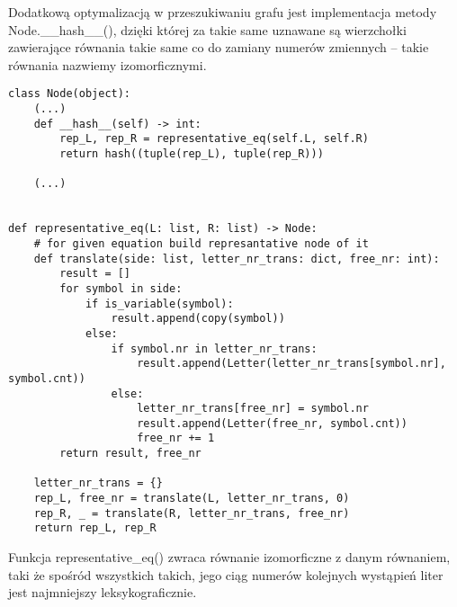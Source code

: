 \documentclass[leqno, 12pt]{article}
\begin{document}
Dodatkową optymalizacją w przeszukiwaniu grafu jest implementacja metody Node.\_\_hash\_\_(), dzięki której za takie same uznawane są wierzchołki zawierające równania takie same co do zamiany numerów zmiennych -- takie równania nazwiemy izomorficznymi.

\begin{verbatim}
class Node(object):
    (...)
    def __hash__(self) -> int:
        rep_L, rep_R = representative_eq(self.L, self.R)
        return hash((tuple(rep_L), tuple(rep_R)))

    (...)


def representative_eq(L: list, R: list) -> Node:
    # for given equation build represantative node of it
    def translate(side: list, letter_nr_trans: dict, free_nr: int):
        result = []
        for symbol in side:
            if is_variable(symbol):
                result.append(copy(symbol))
            else:
                if symbol.nr in letter_nr_trans:
                    result.append(Letter(letter_nr_trans[symbol.nr], symbol.cnt))
                else:
                    letter_nr_trans[free_nr] = symbol.nr
                    result.append(Letter(free_nr, symbol.cnt))
                    free_nr += 1
        return result, free_nr

    letter_nr_trans = {}
    rep_L, free_nr = translate(L, letter_nr_trans, 0)
    rep_R, _ = translate(R, letter_nr_trans, free_nr)
    return rep_L, rep_R
\end{verbatim}

Funkcja representative\_eq() zwraca równanie izomorficzne z danym równaniem, taki że spośród wszystkich takich, jego ciąg numerów kolejnych wystąpień liter jest najmniejszy leksykograficznie. 
\end{document}

